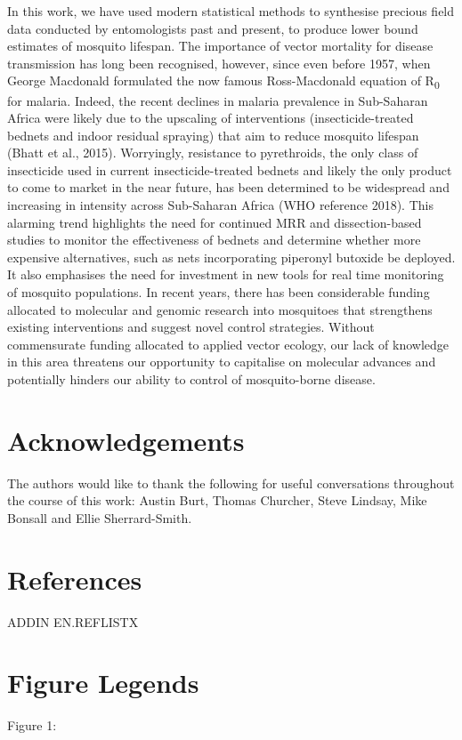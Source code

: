 \documentclass[]{article}
\begin{document}
In this work, we have used modern statistical methods to synthesise
precious field data conducted by entomologists past and present, to
produce lower bound estimates of mosquito lifespan. The importance of
vector mortality for disease transmission has long been recognised,
however, since even before 1957, when George Macdonald formulated the
now famous Ross-Macdonald equation of R\textsubscript{0} for malaria.
Indeed, the recent declines in malaria prevalence in Sub-Saharan Africa
were likely due to the upscaling of interventions (insecticide-treated
bednets and indoor residual spraying) that aim to reduce mosquito
lifespan (Bhatt et al., 2015). Worryingly, resistance to pyrethroids,
the only class of insecticide used in current insecticide-treated
bednets and likely the only product to come to market in the near
future, has been determined to be widespread and increasing in intensity
across Sub-Saharan Africa (WHO reference 2018). This alarming trend
highlights the need for continued MRR and dissection-based studies to
monitor the effectiveness of bednets and determine whether more
expensive alternatives, such as nets incorporating piperonyl butoxide be
deployed. It also emphasises the need for investment in new tools for
real time monitoring of mosquito populations. In recent years, there has
been considerable funding allocated to molecular and genomic research
into mosquitoes that strengthens existing interventions and suggest
novel control strategies. Without commensurate funding allocated to
applied vector ecology, our lack of knowledge in this area threatens our
opportunity to capitalise on molecular advances and potentially hinders
our ability to control of mosquito-borne disease.

\section{Acknowledgements}\label{acknowledgements}

The authors would like to thank the following for useful conversations
throughout the course of this work: Austin Burt, Thomas Churcher, Steve
Lindsay, Mike Bonsall and Ellie Sherrard-Smith.

\section{References}\label{references}

ADDIN EN.REFLISTX

\section{Figure Legends}\label{figure-legends}

Figure 1:
\end{document}
